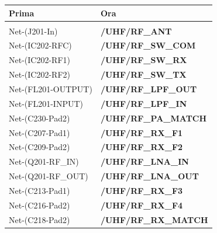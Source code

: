 {\small{}\setlength{\tabcolsep}{4pt}\renewcommand{\arraystretch}{1.0}
\begin{xltabular}{\linewidth}{>{\hsize\raggedright\arraybackslash}X>{\hsize\raggedright\arraybackslash}X}
\toprule
\textbf{Prima} & \textbf{Ora} \\
\midrule
\endhead
\midrule[0.15pt]\\\bottomrule\endfoot
\bottomrule\endlastfoot
Net-(J201-In) & \textbf{/\allowbreak{}UHF/\allowbreak{}RF\_\allowbreak{}ANT} \\\midrule[0.15pt]
Net-(IC202-RFC) & \textbf{/\allowbreak{}UHF/\allowbreak{}RF\_\allowbreak{}SW\_\allowbreak{}COM} \\\midrule[0.15pt]
Net-(IC202-RF1) & \textbf{/\allowbreak{}UHF/\allowbreak{}RF\_\allowbreak{}SW\_\allowbreak{}RX} \\\midrule[0.15pt]
Net-(IC202-RF2) & \textbf{/\allowbreak{}UHF/\allowbreak{}RF\_\allowbreak{}SW\_\allowbreak{}TX} \\\midrule[0.15pt]
Net-(FL201-OUTPUT) & \textbf{/\allowbreak{}UHF/\allowbreak{}RF\_\allowbreak{}LPF\_\allowbreak{}OUT} \\\midrule[0.15pt]
Net-(FL201-INPUT) & \textbf{/\allowbreak{}UHF/\allowbreak{}RF\_\allowbreak{}LPF\_\allowbreak{}IN} \\\midrule[0.15pt]
Net-(C230-Pad2) & \textbf{/\allowbreak{}UHF/\allowbreak{}RF\_\allowbreak{}PA\_\allowbreak{}MATCH} \\\midrule[0.15pt]
Net-(C207-Pad1) & \textbf{/\allowbreak{}UHF/\allowbreak{}RF\_\allowbreak{}RX\_\allowbreak{}F1} \\\midrule[0.15pt]
Net-(C209-Pad2) & \textbf{/\allowbreak{}UHF/\allowbreak{}RF\_\allowbreak{}RX\_\allowbreak{}F2} \\\midrule[0.15pt]
Net-(Q201-RF\_\allowbreak{}IN) & \textbf{/\allowbreak{}UHF/\allowbreak{}RF\_\allowbreak{}LNA\_\allowbreak{}IN} \\\midrule[0.15pt]
Net-(Q201-RF\_\allowbreak{}OUT) & \textbf{/\allowbreak{}UHF/\allowbreak{}RF\_\allowbreak{}LNA\_\allowbreak{}OUT} \\\midrule[0.15pt]
Net-(C213-Pad1) & \textbf{/\allowbreak{}UHF/\allowbreak{}RF\_\allowbreak{}RX\_\allowbreak{}F3} \\\midrule[0.15pt]
Net-(C216-Pad2) & \textbf{/\allowbreak{}UHF/\allowbreak{}RF\_\allowbreak{}RX\_\allowbreak{}F4} \\\midrule[0.15pt]
Net-(C218-Pad2) & \textbf{/\allowbreak{}UHF/\allowbreak{}RF\_\allowbreak{}RX\_\allowbreak{}MATCH} \\\midrule[0.15pt]

\end{xltabular}}
